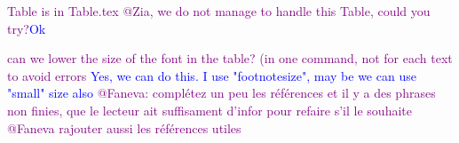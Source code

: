 \documentclass[graybox]{svmult}
\newcommand{\jm}[1]{\textcolor{purple}{{  #1}}}
\newcommand{\zu}[1]{\textcolor{blue}{{#1}}}
\begin{document}
\jm{Table is in Table.tex}
\jm{@Zia, we do not manage to handle this Table, could you try?}\zu{Ok}

\jm{can we lower the size of the font in the table? (in one command, not for each text to avoid errors} \zu{Yes, we can do this. I use "footnotesize", may be we can use "small" size also}
\jm{@Faneva: complétez un peu les références et il y a des phrases non finies, que le lecteur ait suffisament d'infor pour refaire s'il le souhaite}  
\jm{@Faneva rajouter aussi les références utiles}


\end{document}
